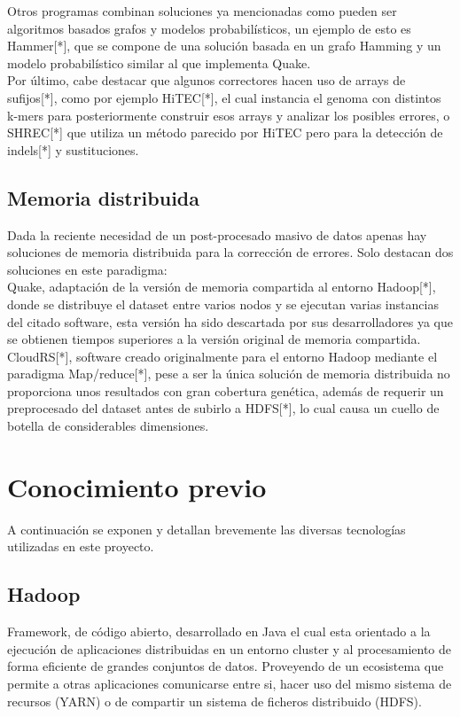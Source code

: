\documentclass[conference]{IEEEtran}
\begin{document}
Otros programas combinan soluciones ya mencionadas como pueden ser algoritmos basados grafos y modelos probabilísticos, un ejemplo de esto es Hammer[*], que se compone de una solución basada en un grafo Hamming y un modelo probabilístico similar al que implementa Quake.\\

Por último, cabe destacar que algunos correctores hacen uso de arrays de sufijos[*], como por ejemplo HiTEC[*], el cual instancia el genoma con distintos k-mers para posteriormente construir esos arrays y analizar los posibles errores, o SHREC[*] que utiliza un método parecido por HiTEC pero para la detección de indels[*] y sustituciones.\\

\subsection{Memoria distribuida}
Dada la reciente necesidad de un post-procesado masivo de datos apenas hay soluciones de memoria distribuida para la corrección de errores. Solo destacan dos soluciones en este paradigma:\\

Quake, adaptación de la versión de memoria compartida al entorno Hadoop[*], donde se distribuye el dataset entre varios nodos y se ejecutan varias instancias del citado software, esta versión ha sido descartada por sus desarrolladores ya que se obtienen tiempos superiores a la versión original de memoria compartida.\\

CloudRS[*], software creado originalmente para el entorno Hadoop mediante el paradigma Map/reduce[*], pese a ser la única solución de memoria distribuida no proporciona unos resultados con gran cobertura genética, además de requerir un preprocesado del dataset antes de subirlo a HDFS[*], lo cual causa un cuello de botella de considerables dimensiones.\\

\section{Conocimiento previo}

A continuación se exponen y detallan brevemente las diversas tecnologías utilizadas en este proyecto.

\subsection{Hadoop}
Framework, de código abierto, desarrollado en Java el cual esta orientado a la ejecución de aplicaciones distribuidas en un entorno cluster y al procesamiento de forma eficiente de grandes conjuntos de datos. Proveyendo de un ecosistema que permite a otras aplicaciones comunicarse entre si, hacer uso del mismo sistema de recursos (YARN) o de compartir un sistema de ficheros distribuido (HDFS).
\end{document}
